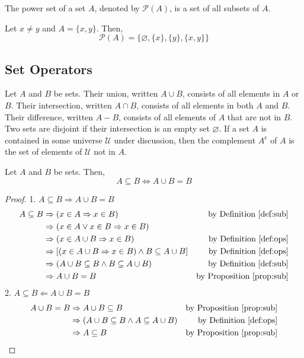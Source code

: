 \documentclass[../main.tex]{subfiles}
\begin{document}
\begin{defn} \label{def:pow}
    The \textsf{power set} of a set $A$, denoted by $\mathcal{P} (A)$, is a set of all subsets of $A$.
\end{defn}

\begin{ex}
    Let $x \neq y$ and $A = \{ x, y\}$.
    Then,
    \[
        \mathcal{P} (A) = \{ \varnothing, \{x\}, \{y\}, \{x, y\}\}
    \]
\end{ex}

\subsection{Set Operators}
\begin{defn} \label{def:ops}
    Let $A$ and $B$ be sets.
    Their \textsf{union}, written $A \cup B$, consists of all elements in $A$ or $B$.
    Their \textsf{intersection}, written $A \cap B$, consists of all elements in both $A$ and $B$.
    Their \textsf{difference}, written $A - B$, consists of all elements of $A$ that are not in $B$.
    Two sets are \textsf{disjoint} if their intersection is an empty set $\varnothing$.
    If a set $A$ is contained in some universe $\mathcal U$ under discussion, then the complement $A^\mathsf{c}$ of $A$ is the set of elements of $\mathcal U$ not in $A$.
\end{defn}

\begin{prop} \label{prop:union}
    Let $A$ and $B$ be sets.
    Then,
    \[
        A \subseteq B \Leftrightarrow A \cup B = B
    \]
\end{prop}
\begin{proof}
    1. $A \subseteq B \Rightarrow A \cup B = B$
    \begin{align*}
        A \subseteq B &\Rightarrow (x \in A \Rightarrow x \in B) &\text{by Definition~\ref{def:sub}}\\
                      &\Rightarrow (x \in A \vee x \in B \Rightarrow x \in B)\\
                      &\Rightarrow (x \in A \cup B \Rightarrow x \in B) &\text{by Definition~\ref{def:ops}}\\
                      &\Rightarrow [(x \in A \cup B \Rightarrow x \in B) \wedge B \subseteq A \cup B] &\text{by Definition~\ref{def:ops}}\\
                      &\Rightarrow (A \cup B \subseteq B \wedge B \subseteq A \cup B) &\text{by Definition~\ref{def:sub}}\\
                      &\Rightarrow A \cup B = B &\text{by Proposition~\ref{prop:sub}}
    \end{align*}
    2. $A \subseteq B \Leftarrow A \cup B = B$
    \begin{align*}
        A \cup B = B &\Rightarrow A \cup B \subseteq B &\text{by Proposition~\ref{prop:sub}}\\
                     &\Rightarrow (A \cup B \subseteq B \wedge A \subseteq A \cup B) &\text{by Definition~\ref{def:ops}}\\
                     &\Rightarrow A \subseteq B &\text{by Proposition~\ref{prop:sub}}
    \end{align*}
\end{proof}
\end{document}
